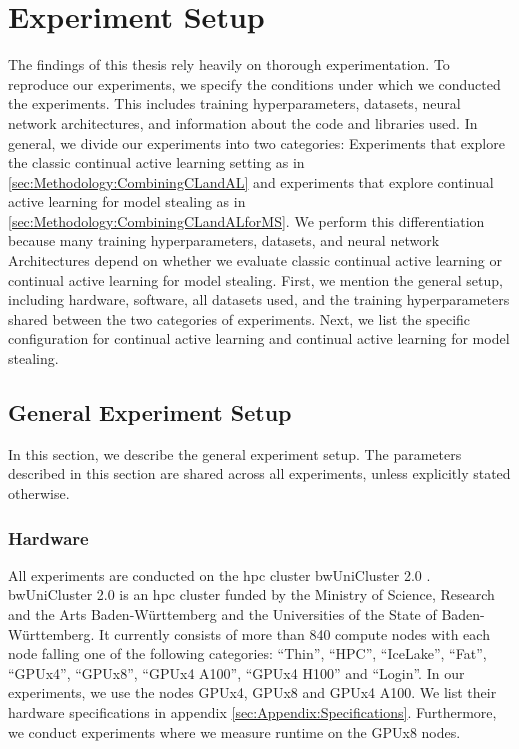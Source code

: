 
\chapter{Experiment Setup}
\label{ch:ExperimentSetup}
The findings of this thesis rely heavily on thorough experimentation. To reproduce our experiments, we specify the
conditions under which we conducted the experiments. This includes training hyperparameters, datasets, neural network architectures,
and information about the code and libraries used. In general, we divide our experiments into two categories: Experiments that explore
the classic continual active learning setting as in \ref{sec:Methodology:CombiningCLandAL} and experiments that explore continual 
active learning for model stealing as in \ref{sec:Methodology:CombiningCLandALforMS}. We perform this differentiation because many 
training hyperparameters, datasets, and neural network Architectures depend on whether we evaluate classic continual active learning or continual 
active learning for model stealing. First, we mention the general setup, including hardware, software, all datasets used, and the training
hyperparameters shared between the two categories of experiments. Next, we list the specific configuration for
continual active learning and continual active learning for model stealing.

\section{General Experiment Setup}
\label{sec:ExperimentSetup:FirstSection}
In this section, we describe the general experiment setup. The parameters described in this section are shared across all experiments, unless
explicitly stated otherwise.

\subsection{Hardware}
All experiments are conducted on the \gls{hpc} cluster bwUniCluster 2.0 \cite{bwUnicluster}. bwUniCluster 2.0 is an \gls{hpc} cluster
funded by the Ministry of Science, Research and the Arts Baden-Württemberg and the Universities of the State of Baden-Württemberg. It currently consists
of more than 840 compute nodes with each node falling one of the following categories: \enquote{Thin}, \enquote{HPC}, \enquote{IceLake}, \enquote{Fat},
\enquote{GPUx4}, \enquote{GPUx8}, \enquote{GPUx4 A100}, \enquote{GPUx4 H100} and \enquote{Login}. In our experiments, we use the nodes GPUx4, GPUx8 and
GPUx4 A100. We list their hardware specifications in appendix \ref{sec:Appendix:Specifications}. Furthermore, we conduct experiments where we
measure runtime on the GPUx8 nodes.

